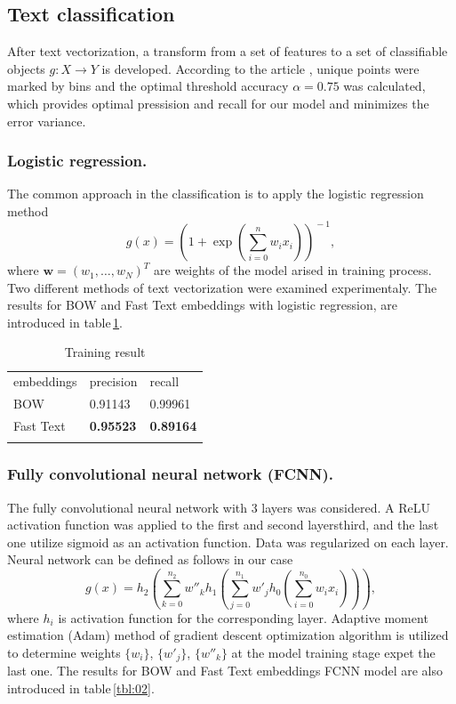 \documentclass[12pt]{jpconf}
\begin{document}
\subsection{Text classification}
After text vectorization, a transform from a set of features to a set of classifiable objects $g: X \rightarrow Y$ is developed.
According to the article \cite{Bommannavar2014,Yang2014}, unique points were marked by bins and the optimal threshold accuracy $\alpha = 0.75$ was calculated, which provides optimal pressision and recall for our model and minimizes the error variance.

\subsubsection*{Logistic regression.}
The common approach in the classification is to apply the logistic regression method
$$
g(x) = \left(1 + \exp{ \left( \sum_{i=0}^n w_i x_i  \right) }\right)^{\!\!-1}\!\!\!\!,
$$
where $\mathbf{w}=(w_1,\ldots, w_N)^T$ are weights of the model arised in training process.
Two different methods of text vectorization were examined experimentaly.
The results for BOW and Fast Text embeddings with logistic regression, are introduced in table\,\ref{tbl:01}.

\begin{table}[h!]
	\centering
	\caption{\label{tbl:01}Training result}
	\begin{center}
		\begin{tabular}{lll}
			\br
			embeddings & precision & recall \\
			\mr
			BOW & 0.91143 & 0.99961 \\ \hline
			Fast Text & \bf 0.95523 & \bf 0.89164 \\ 
			\br
		\end{tabular}
	\end{center}
\end{table}

\subsubsection*{Fully convolutional neural network (FCNN).}

The fully convolutional neural network with 3 layers was considered. A \textsf{ReLU} activation function was applied to the first and second layersthird, and the last one utilize \textsf{sigmoid} as an activation function. Data was regularized on each layer. Neural network can be defined as follows in our case
$$
g(x) = h_2 \left(\sum_{k=0}^{n_2} w''_k h_1\left(\sum_{j=0}^{n_1} w'_j h_0\left( \sum_{i=0}^{n_0} w_i x_i \right)\right)\right),
$$
where $h_i$ is activation function for the corresponding layer. Adaptive moment estimation (Adam) method of gradient descent optimization algorithm is utilized to determine weights $\{w_i\}$, $\{w'_j\}$, $\{w''_k\}$ at the model training stage expet the last one.
The results for BOW and Fast Text embeddings FCNN model are also introduced in table\,\ref{tbl:02}.
\end{document}

